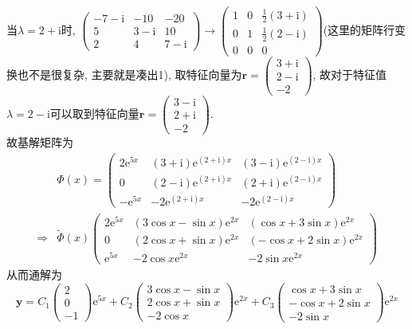 \documentclass[titlepage,11pt,a4paper,twoside]{report}
\makeatletter
\newcommand\e{\mathrm{e}}
\newcommand\ii{\mathrm{i}}
\newcommand\bmitPhi{\bm{\varPhi}}
\newenvironment{solve}{\par
	\pushQED{\qed}%
	\normalfont \topsep1\p@\@plus6\p@\relax
	\trivlist
	\item\relax
	{\hspace*{\parindent}{\heiti 解}\@addpunct{:}}\hspace\labelsep\ignorespaces
}{%
	\popQED\endtrivlist\@endpefalse
}
\makeatother
\begin{document}
\begin{solve}
当$\lambda=2+\ii$时, $\begin{pmatrix}-7-\ii&-10&-20\\5&3-\ii&10\\2&4&7-\ii\end{pmatrix}\to\begin{pmatrix}1&0&\frac{1}{2}(3+\ii)\\0&1&\frac{1}{2}(2-\ii)\\0&0&0\end{pmatrix}$(这里的矩阵行变换也不是很复杂, 主要就是凑出1), 取特征向量为$\bm{r}=\begin{pmatrix}3+\ii\\2-\ii\\-2\end{pmatrix}$, 故对于特征值$\lambda=2-\ii$可以取到特征向量$\bm{r}=\begin{pmatrix}3-\ii\\2+\ii\\-2\end{pmatrix}$.\\
故基解矩阵为
\[\begin{split}
&\bmitPhi(x)=\begin{pmatrix}2\e^{5x}&(3+\ii)\e^{(2+\ii)x}&(3-\ii)\e^{(2-\ii)x}\\0&(2-\ii)\e^{(2+\ii)x}&(2+\ii)\e^{(2-\ii)x}\\-\e^{5x}&-2\e^{(2+\ii)x}&-2\e^{(2-\ii)x}\end{pmatrix}\\
\Rightarrow&\widetilde{\bmitPhi}(x)\begin{pmatrix}2\e^{5x}&(3\cos x-\sin x)\e^{2x}&(\cos x+3\sin x)\e^{2x}\\0&(2\cos x+\sin x)\e^{2x}&(-\cos x+2\sin x)\e^{2x}\\\e^{5x}&-2\cos x\e^{2x}&-2\sin x\e^{2x}\end{pmatrix}
\end{split}\]
从而通解为
\[\bm{y}=C_1\begin{pmatrix}2\\0\\-1\end{pmatrix}\e^{5x}+C_2\begin{pmatrix}3\cos x-\sin x\\2\cos x+\sin x\\-2\cos x\end{pmatrix}\e^{2x}+C_3\begin{pmatrix}\cos x+3\sin x\\-\cos x+2\sin x\\-2\sin x\end{pmatrix}\e^{2x}\]

\end{solve}
\end{document}
